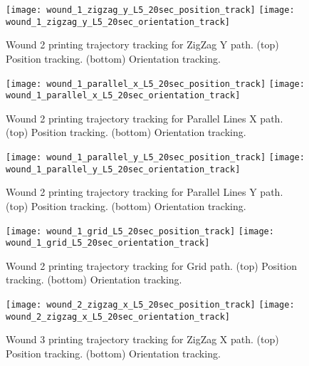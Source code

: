 \begin{figure}[htbp]
	\centering
	\texttt{[image: wound\_1\_zigzag\_y\_L5\_20sec\_position\_track]}
	\texttt{[image: wound\_1\_zigzag\_y\_L5\_20sec\_orientation\_track]}
\caption[Wound 2 printing trajectory tracking for ZigZag Y path.]{Wound 2 printing trajectory tracking for ZigZag Y path. (top) Position tracking. (bottom) Orientation tracking.}
	\label{fig:simulation_test_results_appendix_trajectory_tracking_wound_2_zizzag_y_tracking}
\end{figure}

\begin{figure}[htbp]
	\centering
	\texttt{[image: wound\_1\_parallel\_x\_L5\_20sec\_position\_track]}
	\texttt{[image: wound\_1\_parallel\_x\_L5\_20sec\_orientation\_track]}
	\caption[Wound 2 printing trajectory tracking for Parallel Lines X path.]{Wound 2 printing trajectory tracking for Parallel Lines X path. (top) Position tracking. (bottom) Orientation tracking.}
	\label{fig:simulation_test_results_appendix_trajectory_tracking_wound_2_parallel_x_tracking}
\end{figure}

\begin{figure}[htbp]
	\centering
	\texttt{[image: wound\_1\_parallel\_y\_L5\_20sec\_position\_track]}
	\texttt{[image: wound\_1\_parallel\_y\_L5\_20sec\_orientation\_track]}
    \caption[Wound 2 printing trajectory tracking for Parallel Lines Y path.]{Wound 2 printing trajectory tracking for Parallel Lines Y path. (top) Position tracking. (bottom) Orientation tracking.}
	\label{fig:simulation_test_results_appendix_trajectory_tracking_wound_2_parallel_y_tracking}
\end{figure}

\begin{figure}[htbp]
	\centering
	\texttt{[image: wound\_1\_grid\_L5\_20sec\_position\_track]}
	\texttt{[image: wound\_1\_grid\_L5\_20sec\_orientation\_track]}
    \caption[Wound 2 printing trajectory tracking for Grid path.]{Wound 2 printing trajectory tracking for Grid path. (top) Position tracking. (bottom) Orientation tracking.}
	\label{fig:simulation_test_results_appendix_trajectory_tracking_wound_2_grid_tracking}
\end{figure}


\begin{figure}[htbp]
	\centering
	\texttt{[image: wound\_2\_zigzag\_x\_L5\_20sec\_position\_track]}
	\texttt{[image: wound\_2\_zigzag\_x\_L5\_20sec\_orientation\_track]}
	\caption[Wound 3 printing trajectory tracking for ZigZag X path.]{Wound 3 printing trajectory tracking for ZigZag X path. (top) Position tracking. (bottom) Orientation tracking.}
    \label{fig:simulation_test_results_appendix_trajectory_tracking_wound_3_zizzag_x_tracking}
\end{figure}

